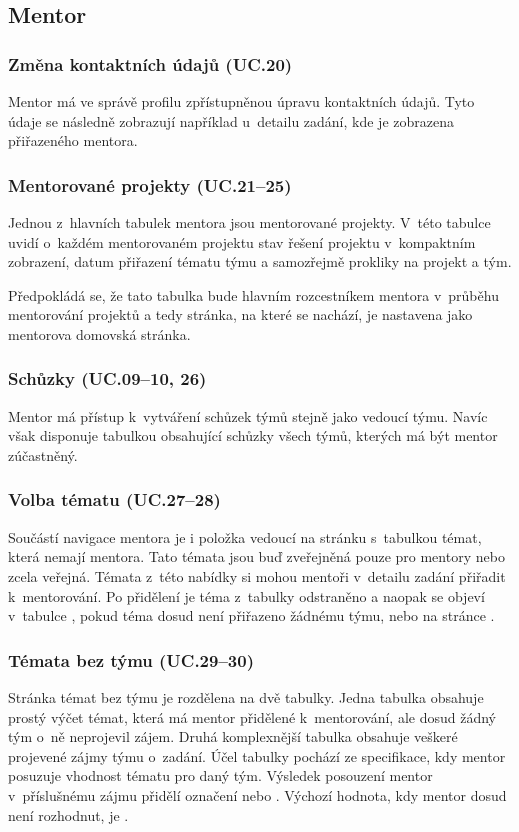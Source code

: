 \documentclass[czech,BP]{thesiskiv}
\begin{document}
		\subsection{Mentor}
			\subsubsection{Změna kontaktních údajů (UC.20)}
				\par Mentor má ve správě profilu zpřístupněnou úpravu kontaktních údajů. Tyto údaje se následně zobrazují například u~detailu zadání, kde je zobrazena  přiřazeného mentora.
			\subsubsection{Mentorované projekty (UC.21--25)}
				\par Jednou z~hlavních tabulek mentora jsou mentorované projekty. V~této tabulce uvidí o~každém mentorovaném projektu stav řešení projektu v~kompaktním zobrazení, datum přiřazení tématu týmu a samozřejmě prokliky na projekt a tým.
				\par Předpokládá se, že tato tabulka bude hlavním rozcestníkem mentora v~průběhu mentorování projektů a tedy stránka, na které se nachází, je nastavena jako mentorova domovská stránka.
			\subsubsection{Schůzky (UC.09--10, 26)}
				\par Mentor má přístup k~vytváření schůzek týmů stejně jako vedoucí týmu. Navíc však disponuje tabulkou obsahující schůzky všech týmů, kterých má být mentor zúčastněný.
			\subsubsection{Volba tématu (UC.27--28)}
				\par Součástí navigace mentora je i položka  vedoucí na stránku s~tabulkou témat, která nemají mentora. Tato témata jsou buď zveřejněná pouze pro mentory nebo zcela veřejná. Témata z~této nabídky si mohou mentoři v~detailu zadání přiřadit k~mentorování. Po přidělení je téma z~tabulky odstraněno a naopak se objeví v~tabulce , pokud téma dosud není přiřazeno žádnému týmu, nebo na stránce .
			\subsubsection{Témata bez týmu (UC.29--30)}
				\par Stránka témat bez týmu je rozdělena na dvě tabulky. Jedna tabulka obsahuje prostý výčet témat, která má mentor přidělené k~mentorování, ale dosud žádný tým o~ně neprojevil zájem. Druhá komplexnější tabulka obsahuje veškeré projevené zájmy týmu o~zadání. Účel tabulky pochází ze specifikace, kdy mentor posuzuje vhodnost tématu pro daný tým. Výsledek posouzení mentor v~příslušnému zájmu přidělí označení  nebo . Výchozí hodnota, kdy mentor dosud není rozhodnut, je .
\end{document}
